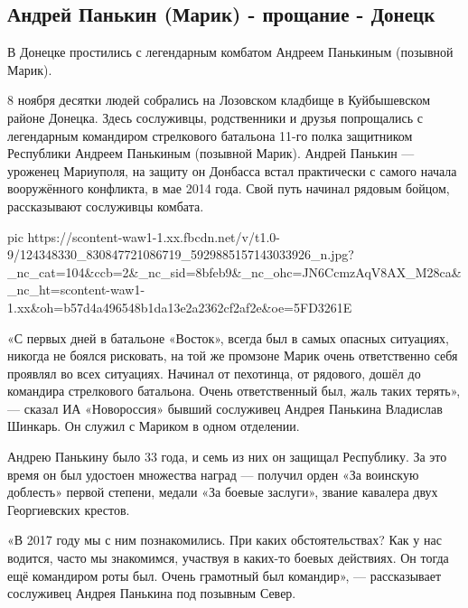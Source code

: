  
 
 

\subsection{Андрей Панькин (Марик) - прощание - Донецк}


В Донецке простились с легендарным комбатом Андреем Панькиным (позывной Марик).

8 ноября десятки людей собрались на Лозовском кладбище в Куйбышевском районе
Донецка. Здесь сослуживцы, родственники и друзья попрощались с легендарным
командиром стрелкового батальона 11-го полка защитником Республики Андреем
Панькиным (позывной Марик).  Андрей Панькин — уроженец Мариуполя, на защиту он
Донбасса встал практически с самого начала вооружённого конфликта, в мае 2014
года. Свой путь начинал рядовым бойцом, рассказывают сослуживцы комбата.

\ifcmt
pic https://scontent-waw1-1.xx.fbcdn.net/v/t1.0-9/124348330_830847721086719_5929885157143033926_n.jpg?_nc_cat=104&ccb=2&_nc_sid=8bfeb9&_nc_ohc=JN6CcmzAqV8AX_M28ca&_nc_ht=scontent-waw1-1.xx&oh=b57d4a496548b1da13e2a2362cf2af2e&oe=5FD3261E
\fi

«С первых дней в батальоне «Восток», всегда был в самых опасных ситуациях,
никогда не боялся рисковать, на той же промзоне Марик очень ответственно себя
проявлял во всех ситуациях. Начинал от пехотинца, от рядового, дошёл до
командира стрелкового батальона. Очень ответственный был, жаль таких терять», —
сказал ИА «Новороссия» бывший сослуживец Андрея Панькина Владислав Шинкарь. Он
служил с Мариком в одном отделении.

Андрею Панькину было 33 года, и семь из них он защищал Республику. За это время
он был удостоен множества наград — получил орден «За воинскую доблесть» первой
степени, медали «За боевые заслуги», звание кавалера двух Георгиевских крестов.

«В 2017 году мы с ним познакомились. При каких обстоятельствах? Как у нас
водится, часто мы знакомимся, участвуя в каких-то боевых действиях. Он тогда
ещё командиром роты был. Очень грамотный был командир», — рассказывает
сослуживец Андрея Панькина под позывным Север.

